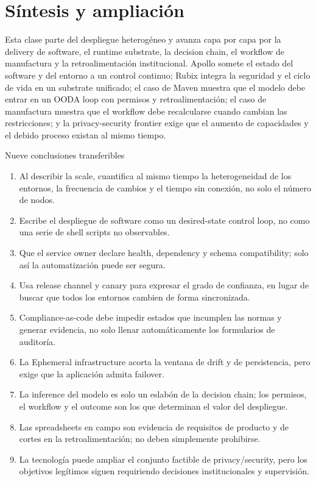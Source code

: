 \documentclass[a4paper]{article}
\begin{document}
\section{Síntesis y ampliación}

Esta clase parte del despliegue heterogéneo y avanza capa por capa por la delivery de software, el runtime substrate, la decision chain, el workflow de manufactura y la retroalimentación institucional. Apollo somete el estado del software y del entorno a un control continuo; Rubix integra la seguridad y el ciclo de vida en un substrate unificado; el caso de Maven muestra que el modelo debe entrar en un OODA loop con permisos y retroalimentación; el caso de manufactura muestra que el workflow debe recalcularse cuando cambian las restricciones; y la privacy-security frontier exige que el aumento de capacidades y el debido proceso existan al mismo tiempo.

\begin{importantbox}{Nueve conclusiones transferibles}
\begin{enumerate}
  \item Al describir la scale, cuantifica al mismo tiempo la heterogeneidad de los entornos, la frecuencia de cambios y el tiempo sin conexión, no solo el número de nodos.
  \item Escribe el despliegue de software como un desired-state control loop, no como una serie de shell scripts no observables.
  \item Que el service owner declare health, dependency y schema compatibility; solo así la automatización puede ser segura.
  \item Usa release channel y canary para expresar el grado de confianza, en lugar de buscar que todos los entornos cambien de forma sincronizada.
  \item Compliance-as-code debe impedir estados que incumplen las normas y generar evidencia, no solo llenar automáticamente los formularios de auditoría.
  \item La Ephemeral infrastructure acorta la ventana de drift y de persistencia, pero exige que la aplicación admita failover.
  \item La inference del modelo es solo un eslabón de la decision chain; los permisos, el workflow y el outcome son los que determinan el valor del despliegue.
  \item Las spreadsheets en campo son evidencia de requisitos de producto y de cortes en la retroalimentación; no deben simplemente prohibirse.
  \item La tecnología puede ampliar el conjunto factible de privacy/security, pero los objetivos legítimos siguen requiriendo decisiones institucionales y supervisión.
\end{enumerate}
\end{importantbox}
\end{document}
